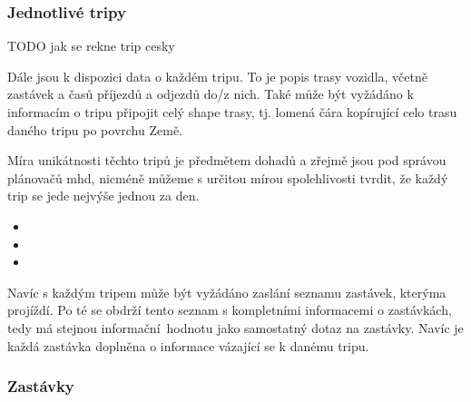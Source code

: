 \subsubsection{Jednotlivé tripy}

TODO jak se rekne trip cesky

Dále jsou k dispozici data o každém tripu. To je popis trasy vozidla, včetně zastávek a časů příjezdů a odjezdů do/z nich. Také může být vyžádáno k informacím o tripu připojit celý shape trasy, tj. lomená čára kopírující celo trasu daného tripu po povrchu Země.

\bigbreak

 Míra unikátnosti těchto tripů je předmětem dohadů a zřejmě jsou pod správou plánovačů \gls{mhd}, nicméně můžeme s určitou mírou spolehlivosti tvrdit, že každý trip se jede nejvýše jednou za den.

\begin{itemize}
	\item {}

	\item {}

	\item {}
\end{itemize}

Navíc s každým tripem může být vyžádáno zaslání seznamu zastávek, kterýma projíždí. Po té se obdrží tento seznam s kompletními informacemi o zastávkách, tedy má stejnou informační hodnotu jako samostatný dotaz na zastávky. Navíc je každá zastávka doplněna o informace vázající se k danému tripu.

\subsubsection{Zastávky}

